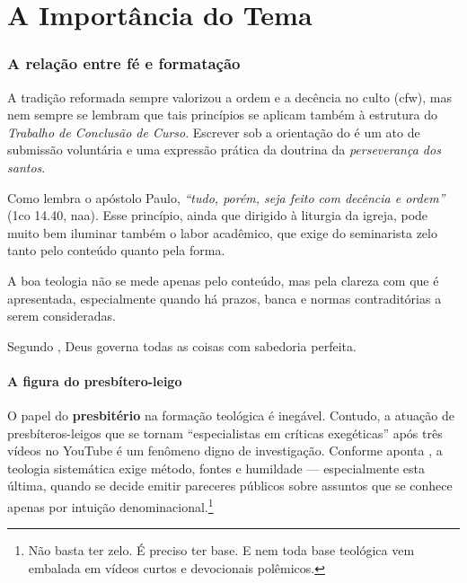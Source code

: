 \chapter{A Importância do Tema}
\label{cap:importancia}

\subsection{A relação entre fé e formatação}

A tradição reformada sempre valorizou a ordem e a decência no culto (\gls{cfw}), mas nem sempre se lembram que tais princípios se aplicam também à estrutura do \textit{Trabalho de Conclusão de Curso}. Escrever sob a orientação do \imprimirorientador é um ato de submissão voluntária e uma expressão prática da doutrina da \textit{perseverança dos santos}.

Como lembra o apóstolo Paulo, \textit{``tudo, porém, seja feito com decência e ordem''} (\gls{1co} 14.40, \gls{naa}). Esse princípio, ainda que dirigido à liturgia da igreja, pode muito bem iluminar também o labor acadêmico, que exige do seminarista zelo tanto pelo conteúdo quanto pela forma.

\begin{citacao}
    A boa teologia não se mede apenas pelo conteúdo, mas pela clareza com que é apresentada, especialmente quando há prazos, banca e normas contraditórias a serem consideradas.
\end{citacao}

Segundo , Deus governa todas as coisas com sabedoria perfeita.

\subsubsection{A figura do presbítero-leigo}

O papel do \textbf{presbitério} na formação teológica é inegável. Contudo, a atuação de presbíteros-leigos que se tornam ``especialistas em críticas exegéticas'' após três vídeos no YouTube é um fenômeno digno de investigação. Conforme aponta \cite{bavinckDogmatica}, a teologia sistemática exige método, fontes e humildade — especialmente esta última, quando se decide emitir pareceres públicos sobre assuntos que se conhece apenas por intuição denominacional.\footnote{Não basta ter zelo. É preciso ter base. E nem toda base teológica vem embalada em vídeos curtos e devocionais polêmicos.}
